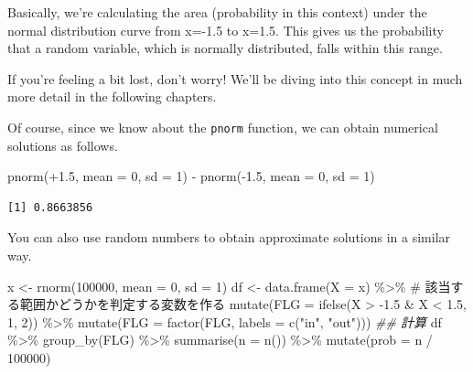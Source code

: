 \documentclass[
  a4paper,
]{book}
\newenvironment{Shaded}{\begin{snugshade}}{\end{snugshade}}
\newcommand{\AttributeTok}[1]{\textcolor[rgb]{0.40,0.45,0.13}{#1}}
\newcommand{\CommentTok}[1]{\textcolor[rgb]{0.37,0.37,0.37}{#1}}
\newcommand{\DecValTok}[1]{\textcolor[rgb]{0.68,0.00,0.00}{#1}}
\newcommand{\DocumentationTok}[1]{\textcolor[rgb]{0.37,0.37,0.37}{\textit{#1}}}
\newcommand{\FloatTok}[1]{\textcolor[rgb]{0.68,0.00,0.00}{#1}}
\newcommand{\FunctionTok}[1]{\textcolor[rgb]{0.28,0.35,0.67}{#1}}
\newcommand{\NormalTok}[1]{\textcolor[rgb]{0.00,0.23,0.31}{#1}}
\newcommand{\OtherTok}[1]{\textcolor[rgb]{0.00,0.23,0.31}{#1}}
\newcommand{\SpecialCharTok}[1]{\textcolor[rgb]{0.37,0.37,0.37}{#1}}
\newcommand{\StringTok}[1]{\textcolor[rgb]{0.13,0.47,0.30}{#1}}
\begin{document}
Basically, we're calculating the area (probability in this context)
under the normal distribution curve from x=-1.5 to x=1.5. This gives us
the probability that a random variable, which is normally distributed,
falls within this range.

If you're feeling a bit lost, don't worry! We'll be diving into this
concept in much more detail in the following chapters.

Of course, since we know about the \texttt{pnorm} function, we can
obtain numerical solutions as follows.

\begin{Shaded}
\begin{Highlighting}[]
\FunctionTok{pnorm}\NormalTok{(}\SpecialCharTok{+}\FloatTok{1.5}\NormalTok{, }\AttributeTok{mean =} \DecValTok{0}\NormalTok{, }\AttributeTok{sd =} \DecValTok{1}\NormalTok{) }\SpecialCharTok{{-}} \FunctionTok{pnorm}\NormalTok{(}\SpecialCharTok{{-}}\FloatTok{1.5}\NormalTok{, }\AttributeTok{mean =} \DecValTok{0}\NormalTok{, }\AttributeTok{sd =} \DecValTok{1}\NormalTok{)}
\end{Highlighting}
\end{Shaded}

\begin{verbatim}
[1] 0.8663856
\end{verbatim}

You can also use random numbers to obtain approximate solutions in a
similar way.

\begin{Shaded}
\begin{Highlighting}[]
\NormalTok{x }\OtherTok{\textless{}{-}} \FunctionTok{rnorm}\NormalTok{(}\DecValTok{100000}\NormalTok{, }\AttributeTok{mean =} \DecValTok{0}\NormalTok{, }\AttributeTok{sd =} \DecValTok{1}\NormalTok{)}
\NormalTok{df }\OtherTok{\textless{}{-}} \FunctionTok{data.frame}\NormalTok{(}\AttributeTok{X =}\NormalTok{ x) }\SpecialCharTok{\%\textgreater{}\%}
  \CommentTok{\# 該当する範囲かどうかを判定する変数を作る}
  \FunctionTok{mutate}\NormalTok{(}\AttributeTok{FLG =} \FunctionTok{ifelse}\NormalTok{(X }\SpecialCharTok{\textgreater{}} \SpecialCharTok{{-}}\FloatTok{1.5} \SpecialCharTok{\&}\NormalTok{ X }\SpecialCharTok{\textless{}} \FloatTok{1.5}\NormalTok{, }\DecValTok{1}\NormalTok{, }\DecValTok{2}\NormalTok{)) }\SpecialCharTok{\%\textgreater{}\%}
  \FunctionTok{mutate}\NormalTok{(}\AttributeTok{FLG =} \FunctionTok{factor}\NormalTok{(FLG, }\AttributeTok{labels =} \FunctionTok{c}\NormalTok{(}\StringTok{"in"}\NormalTok{, }\StringTok{"out"}\NormalTok{)))}
\DocumentationTok{\#\# 計算}
\NormalTok{df }\SpecialCharTok{\%\textgreater{}\%}
  \FunctionTok{group\_by}\NormalTok{(FLG) }\SpecialCharTok{\%\textgreater{}\%}
  \FunctionTok{summarise}\NormalTok{(}\AttributeTok{n =} \FunctionTok{n}\NormalTok{()) }\SpecialCharTok{\%\textgreater{}\%}
  \FunctionTok{mutate}\NormalTok{(}\AttributeTok{prob =}\NormalTok{ n }\SpecialCharTok{/} \DecValTok{100000}\NormalTok{)}
\end{Highlighting}
\end{Shaded}
\end{document}
